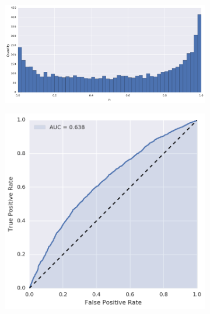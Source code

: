 \begin{figure}[p]
\centering
\begin{subfigure}[t]{\textwidth}
	\centering
	\includegraphics[height=.20\textheight]{figures/bayes/least1/hist_time.png}
\end{subfigure}
\begin{subfigure}[b]{.49\textwidth}
	\raggedleft{}
	\includegraphics[height=.20\textheight]{figures/bayes/least1/roc_time.png}
\end{subfigure}
\begin{subfigure}[b]{.49\textwidth}
	\raggedright{}

\end{subfigure}
\end{figure}
